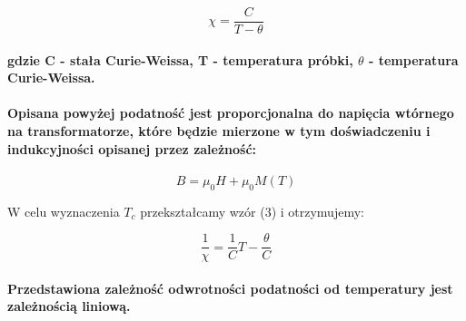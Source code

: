 \documentclass[a4paper,10pt]{article}
\begin{document}
\begin{equation}
\chi = \frac{C}{T - \theta}
\end{equation}

\paragraph{gdzie C - stała Curie-Weissa, T - temperatura próbki, $\theta$ - temperatura Curie-Weissa.}

\paragraph{Opisana powyżej podatność jest proporcjonalna do napięcia wtórnego na transformatorze, które będzie mierzone w tym doświadczeniu i indukcyjności opisanej przez zależność:}

\begin{equation}
B = \mu_0 H + \mu_0 M(T)
\end{equation}

W celu wyznaczenia $T_c$ przekształcamy wzór (3) i otrzymujemy:

\begin{equation}
\frac{1}{\chi} = \frac{1}{C} T - \frac{\theta}{C}
\end{equation}

\paragraph{Przedstawiona zależność odwrotności podatności od temperatury jest zależnością liniową.}
\end{document}
